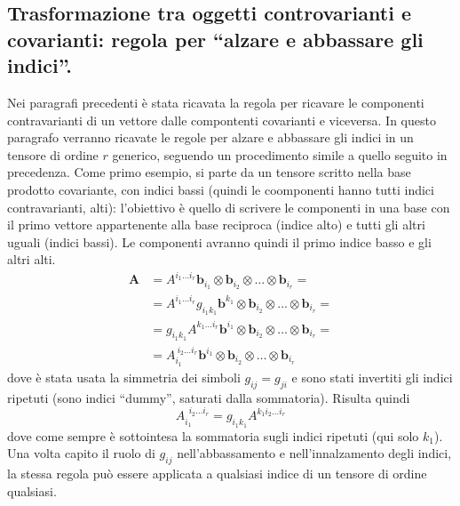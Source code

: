  
 \subsection{Trasformazione tra oggetti controvarianti e covarianti: regola per ``alzare e abbassare gli indici''.}
 Nei paragrafi precedenti è stata ricavata la regola per ricavare le componenti contravarianti di un vettore dalle compontenti
 covarianti e viceversa. In questo paragrafo verranno ricavate le regole per alzare e abbassare gli indici in un tensore di 
 ordine $r$ generico, seguendo un procedimento simile a quello seguito in precedenza.
 Come primo esempio, si parte da un tensore scritto nella base prodotto covariante, con indici bassi
 (quindi le coomponenti hanno tutti indici contravarianti, alti): l'obiettivo è quello di scrivere le componenti in una base con il primo vettore
 appartenente alla base reciproca (indice alto) e tutti gli altri uguali (indici bassi). Le componenti avranno quindi il primo
 indice basso e gli altri alti.
 \begin{equation}
 \begin{aligned}
  \bm{A} & = A^{i_1 \dots i_r} \bm{b}_{i_1} \otimes \bm{b}_{i_2} \otimes \dots \otimes \bm{b}_{i_r} = \\
         & = A^{i_1 \dots i_r} g_{i_1 k_1} \bm{b}^{k_1} \otimes \bm{b}_{i_2} \otimes \dots \otimes \bm{b}_{i_r} = \\
         & = g_{i_1 k_1}A^{k_1 \dots i_r} \bm{b}^{i_1} \otimes \bm{b}_{i_2} \otimes \dots \otimes \bm{b}_{i_r} = \\
         & = A_{i_1}^{\ i_2 \dots i_r} \bm{b}^{i_1} \otimes \bm{b}_{i_2} \otimes \dots \otimes \bm{b}_{i_r}
 \end{aligned}
 \end{equation}
 dove è stata usata la simmetria dei simboli $g_{ij} = g_{ji}$ e sono stati invertiti gli indici ripetuti (sono indici ``dummy'',
 saturati dalla sommatoria). Risulta quindi
 \begin{equation}\label{eqn:t2td}
   A_{i_1}^{\ \ i_2\dots i_r} = g_{i_1 k_1} A^{k_1 i_2 \dots i_r}
 \end{equation}
 dove come sempre è sottointesa la sommatoria sugli indici ripetuti (qui solo $k_1$). Una volta capito il ruolo di $g_{ij}$ nell'abbassamento
 e nell'innalzamento degli indici, la stessa regola può essere applicata a qualsiasi indice di un tensore di ordine qualsiasi.

